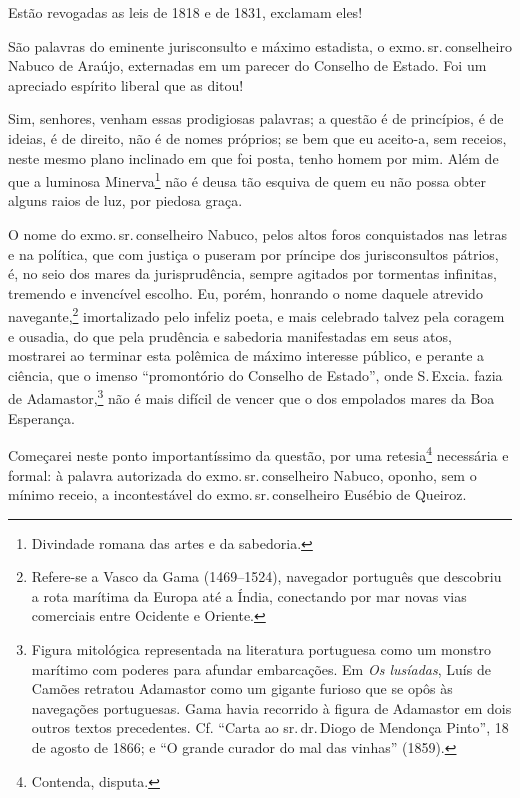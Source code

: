 Estão revogadas as leis de 1818 e de 1831, exclamam eles!

São palavras do eminente jurisconsulto e máximo estadista, o exmo.\,sr.\,conselheiro Nabuco de Araújo, externadas em um parecer do Conselho de
Estado. Foi um apreciado espírito liberal que as ditou!

Sim, senhores, venham essas prodigiosas palavras; a questão é de
princípios, é de ideias, é de direito, não é de nomes próprios; se bem
que eu aceito-a, sem receios, neste mesmo plano inclinado em que foi
posta, tenho homem por mim. Além de que a luminosa Minerva\footnote{
  Divindade romana das artes e da sabedoria.} não é deusa tão esquiva de
quem eu não possa obter alguns raios de luz, por piedosa graça.

O nome do exmo.\,sr.\,conselheiro Nabuco, pelos altos foros conquistados
nas letras e na política, que com justiça o puseram por príncipe dos
jurisconsultos pátrios, é, no seio dos mares da jurisprudência, sempre
agitados por tormentas infinitas, tremendo e invencível escolho. Eu,
porém, honrando o nome daquele atrevido navegante,\footnote{Refere-se a
  Vasco da Gama (1469--1524), navegador português que descobriu a rota
  marítima da Europa até a Índia, conectando por mar novas vias
  comerciais entre Ocidente e Oriente.} imortalizado pelo infeliz
poeta, e mais celebrado talvez pela coragem e ousadia, do que pela
prudência e sabedoria manifestadas em seus atos, mostrarei ao terminar
esta polêmica de máximo interesse público, e perante a ciência, que o
imenso ``promontório do Conselho de Estado'', onde S.\,Excia. fazia de
Adamastor,\footnote{Figura mitológica representada na literatura
  portuguesa como um monstro marítimo com poderes para afundar
  embarcações. Em \emph{Os lusíadas}, Luís de Camões retratou Adamastor
  como um gigante furioso que se opôs às navegações portuguesas. Gama
  havia recorrido à figura de Adamastor em dois outros textos
  precedentes. Cf. ``Carta ao sr.\,dr.\,Diogo de Mendonça Pinto'',
  18 de agosto de 1866; e ``O grande curador do mal das vinhas'' (1859).} não
é mais difícil de vencer que o dos empolados mares da Boa Esperança.

Começarei neste ponto importantíssimo da questão, por uma
retesia\footnote{Contenda, disputa.} necessária e formal: à palavra
autorizada do exmo.\,sr.\,conselheiro Nabuco, oponho, sem o mínimo receio,
a incontestável do exmo.\,sr.\,conselheiro Eusébio de Queiroz.

